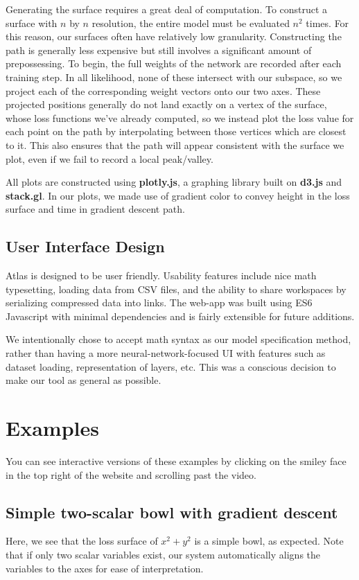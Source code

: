 \documentclass[letterpaper]{article}
\begin{document}
Generating the surface requires a great deal of computation. To construct a surface with $n$ by $n$ resolution, the entire model must be evaluated $n^2$ times. For this reason, our surfaces often have relatively low granularity. Constructing the path is generally less expensive but still involves a significant amount of prepossessing. To begin, the full weights of the network are recorded after each training step. In all likelihood, none of these intersect with our subspace, so we project each of the corresponding weight vectors onto our two axes. These projected positions generally do not land exactly on a vertex of the surface, whose loss functions we've already computed, so we instead plot the loss value for each point on the path by interpolating between those vertices which are closest to it. This also ensures that the path will appear consistent with the surface we plot, even if we fail to record a local peak/valley.

All plots are constructed using \textbf{plotly.js}, a graphing library built on \textbf{d3.js} and \textbf{stack.gl}. In our plots, we made use of gradient color to convey height in the loss surface and time in gradient descent path.

\subsection{User Interface Design}

Atlas is designed to be user friendly. Usability features include nice math typesetting, loading data from CSV files, and the ability to share workspaces by serializing compressed data into links.  The web-app was built using ES6 Javascript with minimal dependencies and is fairly extensible for future additions.

We intentionally chose to accept math syntax as our model specification method, rather than having a more neural-network-focused UI with features such as dataset loading, representation of layers, etc.  This was a conscious decision to make our tool as general as possible.

\section{Examples}

You can see interactive versions of these examples by clicking on the smiley face in the top right of the website and scrolling past the video. 

\subsection{Simple two-scalar bowl with gradient descent}
Here, we see that the loss surface of $x^2 + y^2$ is a simple bowl, as expected. Note that if only two scalar variables exist, our system automatically aligns the variables to the axes for ease of interpretation.
\end{document}
